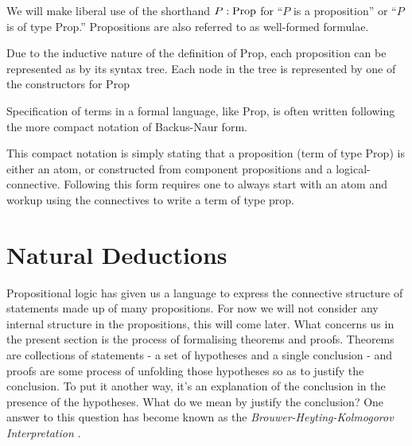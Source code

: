 \documentclass{book}
\begin{document}
We will make liberal use of the shorthand $P : \text{Prop}$ for ``$P$ is a proposition'' or ``$P$ is of type Prop.'' Propositions are also referred to as well-formed formulae. 

Due to the inductive nature of the definition of Prop, each proposition can be represented as by its syntax tree. Each node in the tree is represented by one of the constructors for Prop



Specification of terms in a formal language, like Prop, is often written following the more compact notation of Backus-Naur form. 


This compact notation is simply stating that a proposition (term of type Prop) is either an atom, or constructed from component propositions and a logical-connective. Following this form requires one to always start with an atom and workup using the connectives to write a term of type prop. 


    \newpage
    \section{Natural Deductions}

    Propositional logic has given us a language to express the connective structure of statements made up of many propositions. For now we will not consider any internal structure in the propositions, this will come later. What concerns us in the present section is the process of formalising theorems and proofs. Theorems are collections of statements - a set of hypotheses and a single conclusion - and proofs are some process of unfolding those hypotheses so as to justify the conclusion. To put it another way, it's an explanation of the conclusion in the presence of the hypotheses. What do we mean by justify the conclusion? One answer to this question has become known as the \emph{Brouwer-Heyting-Kolmogorov Interpretation} \cite{sep-mathematics-constructive}.
\end{document}
